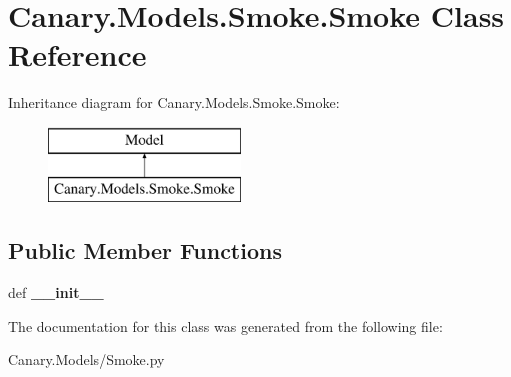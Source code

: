 \hypertarget{class_canary_8_models_1_1_smoke_1_1_smoke}{\section{Canary.\-Models.\-Smoke.\-Smoke Class Reference}
\label{class_canary_8_models_1_1_smoke_1_1_smoke}
}
Inheritance diagram for Canary.\-Models.\-Smoke.\-Smoke\-:\begin{figure}[H]
\begin{center}
\leavevmode
\includegraphics[height=2.000000cm]{class_canary_8_models_1_1_smoke_1_1_smoke}
\end{center}
\end{figure}
\subsection*{Public Member Functions}
\begin{DoxyCompactItemize}
\item 
\hypertarget{class_canary_8_models_1_1_smoke_1_1_smoke_aa3eeb96bbdae8e0b66c1b8067c5a4892}{def {\bfseries \-\_\-\-\_\-init\-\_\-\-\_\-}}\label{class_canary_8_models_1_1_smoke_1_1_smoke_aa3eeb96bbdae8e0b66c1b8067c5a4892}

\end{DoxyCompactItemize}


The documentation for this class was generated from the following file\-:\begin{DoxyCompactItemize}
\item 
Canary.\-Models/Smoke.\-py\end{DoxyCompactItemize}
